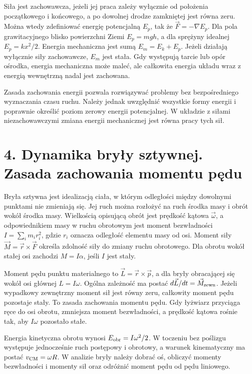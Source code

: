 \documentclass[11pt,a4paper,oneside]{report}
\begin{document}
Siła jest zachowawcza, jeżeli jej praca zależy wyłącznie od położenia początkowego i końcowego, a po dowolnej drodze zamkniętej jest równa zeru. Można wtedy zdefiniować energię potencjalną \(E_p\), tak że \(\vec F=-\nabla E_p\). Dla pola grawitacyjnego blisko powierzchni Ziemi \(E_p=mgh\), a dla sprężyny idealnej \(E_p=kx^2/2\). Energia mechaniczna jest sumą \(E_m=E_k+E_p\). Jeżeli działają wyłącznie siły zachowawcze, \(E_m\) jest stała. Gdy występują tarcie lub opór ośrodka, energia mechaniczna może maleć, ale całkowita energia układu wraz z energią wewnętrzną nadal jest zachowana.

Zasada zachowania energii pozwala rozwiązywać problemy bez bezpośredniego wyznaczania czasu ruchu. Należy jednak uwzględnić wszystkie formy energii i poprawnie określić poziom zerowy energii potencjalnej. W układzie z siłami niezachowawczymi zmiana energii mechanicznej jest równa pracy tych sił.

\section{4. Dynamika bryły sztywnej. Zasada zachowania momentu pędu}
Bryła sztywna jest idealizacją ciała, w którym odległości między dowolnymi punktami nie zmieniają się. Jej ruch można rozłożyć na ruch środka masy i obrót wokół środka masy. Wielkością opisującą obrót jest prędkość kątowa \(\vec\omega\), a odpowiednikiem masy w ruchu obrotowym jest moment bezwładności \(I=\sum_i m_ir_i^2\), gdzie \(r_i\) oznacza odległość elementu masy od osi. Moment siły \(\vec M=\vec r\times\vec F\) określa zdolność siły do zmiany ruchu obrotowego. Dla obrotu wokół stałej osi zachodzi \(M=I\alpha\), jeśli \(I\) jest stały.

Moment pędu punktu materialnego to \(\vec L=\vec r\times\vec p\), a dla bryły obracającej się wokół osi głównej \(L=I\omega\). Ogólna zależność ma postać \(d\vec L/dt=\vec M_{\rm zewn}\). Jeżeli wypadkowy zewnętrzny moment sił jest równy zeru, całkowity moment pędu pozostaje stały. To zasada zachowania momentu pędu. Gdy łyżwiarz przyciąga ręce do osi obrotu, zmniejsza moment bezwładności, a prędkość kątowa rośnie tak, aby \(I\omega\) pozostało stałe.

Energia kinetyczna obrotu wynosi \(E_{\rm obr}=I\omega^2/2\). W toczeniu bez poślizgu występuje jednocześnie ruch postępowy i obrotowy, a warunek kinematyczny ma postać \(v_{\rm CM}=\omega R\). W analizie bryły należy dobrać oś, obliczyć momenty bezwładności i momenty sił oraz odróżnić moment pędu od pędu liniowego.
\end{document}

